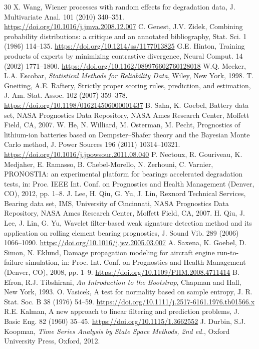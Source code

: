 \begin{thebibliography}{30}
 X. Wang, Wiener processes with random effects for degradation data, J. Multivariate Anal. 101 (2010) 340--351. \url{https://doi.org/10.1016/j.jmva.2008.12.007}
 C. Genest, J.V. Zidek, Combining probability distributions: a critique and an annotated bibliography, Stat. Sci. 1 (1986) 114--135. \url{https://doi.org/10.1214/ss/1177013825}
 G.E. Hinton, Training products of experts by minimizing contrastive divergence, Neural Comput. 14 (2002) 1771--1800. \url{https://doi.org/10.1162/089976602760128018}
 W.Q. Meeker, L.A. Escobar, {\it Statistical Methods for Reliability Data}, Wiley, New York, 1998.
 T. Gneiting, A.E. Raftery, Strictly proper scoring rules, prediction, and estimation, J. Am. Stat. Assoc. 102 (2007) 359--378. \url{https://doi.org/10.1198/016214506000001437}
 B. Saha, K. Goebel, Battery data set, NASA Prognostics Data Repository, NASA Ames Research Center, Moffett Field, CA, 2007.
 W. He, N. Williard, M. Osterman, M. Pecht, Prognostics of lithium-ion batteries based on Dempster--Shafer theory and the Bayesian Monte Carlo method, J. Power Sources 196 (2011) 10314--10321. \url{https://doi.org/10.1016/j.jpowsour.2011.08.040}
 P. Nectoux, R. Gouriveau, K. Medjaher, E. Ramasso, B. Chebel-Morello, N. Zerhouni, C. Varnier, PRONOSTIA: an experimental platform for bearings accelerated degradation tests, in: Proc. IEEE Int. Conf. on Prognostics and Health Management (Denver, CO), 2012, pp. 1--8.
 J. Lee, H. Qiu, G. Yu, J. Lin, Rexnord Technical Services, Bearing data set, IMS, University of Cincinnati, NASA Prognostics Data Repository, NASA Ames Research Center, Moffett Field, CA, 2007.
 H. Qiu, J. Lee, J. Lin, G. Yu, Wavelet filter-based weak signature detection method and its application on rolling element bearing prognostics, J. Sound Vib. 289 (2006) 1066--1090. \url{https://doi.org/10.1016/j.jsv.2005.03.007}
 A. Saxena, K. Goebel, D. Simon, N. Eklund, Damage propagation modeling for aircraft engine run-to-failure simulation, in: Proc. Int. Conf. on Prognostics and Health Management (Denver, CO), 2008, pp. 1--9. \url{https://doi.org/10.1109/PHM.2008.4711414}
 B. Efron, R.J. Tibshirani, {\it An Introduction to the Bootstrap}, Chapman and Hall, New York, 1993.
 O. Vasicek, A test for normality based on sample entropy, J. R. Stat. Soc. B 38 (1976) 54--59. \url{https://doi.org/10.1111/j.2517-6161.1976.tb01566.x}
 R.E. Kalman, A new approach to linear filtering and prediction problems, J. Basic Eng. 82 (1960) 35--45. \url{https://doi.org/10.1115/1.3662552}
 J. Durbin, S.J. Koopman, {\it Time Series Analysis by State Space Methods, 2nd ed.}, Oxford University Press, Oxford, 2012.
\end{thebibliography}
